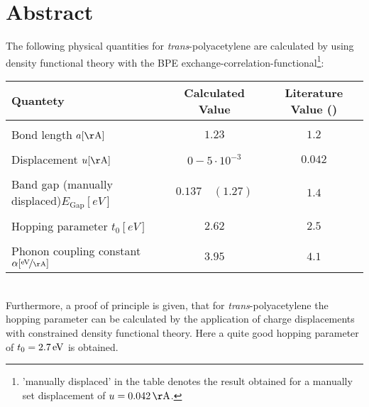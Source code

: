 \chapter*{Abstract}
The following physical quantities for \emph{trans}-polyacetylene are calculated by using density functional theory with the BPE exchange-correlation-functional\footnote{'manually displaced' in the table denotes the result obtained for a manually set displacement of $u = \unit[0.042]{\AA}$.}:
\begin{table}[!h]
	\centering
	\begin{tabular}{l|c|c}
		Quantety & Calculated Value & Literature Value (\cite{PhysRevLett.42.1698, doi:10.1021/cr990357p})\\
		\hline \hline
		&&\\[-.3cm]
		Bond length \hfill$a [\unit{\AA}]$ & $1.23$ & $1.2$\\ \hline&&\\[-.3cm]
		Displacement \hfill$u [\unit{\AA}]$& $0 - 5\cdot10^{-3}$ & $0.042$\\ \hline&&\\[-.3cm]
		Band gap (manually displaced)\hfill$E_\text{Gap} [\unit{eV}]$ & $0.137\quad(1.27)$ & $1.4$\\ \hline &&\\[-.3cm]
		Hopping parameter \hfill$t_0 [\unit{eV}]$ & $2.62$ & $2.5$ \\ \hline&&\\[-.3cm]
		Phonon coupling constant \hspace*{2cm}$\alpha [\unitfrac{eV}{\AA}]$& $3.95$ & $4.1$
	\end{tabular}
\end{table}\\
Furthermore, a proof of principle is given, that for \emph{trans}-polyacetylene the hopping parameter can be calculated by the application of charge displacements with constrained density functional theory. Here a quite good hopping parameter of $t_0 = \unit[2.7]{eV}$ is obtained.

